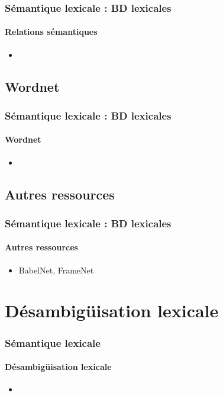 \documentclass[xcolor=table]{beamer}
\begin{document}
\begin{frame}
\frametitle{Sémantique lexicale : BD lexicales}
\framesubtitle{Relations sémantiques}

\begin{itemize}
	\item 
\end{itemize}

\end{frame}

\subsection{Wordnet}

\begin{frame}
\frametitle{Sémantique lexicale : BD lexicales}
\framesubtitle{Wordnet}

\begin{itemize}
	\item 
\end{itemize}

\end{frame}

\subsection{Autres ressources}

\begin{frame}
\frametitle{Sémantique lexicale : BD lexicales}
\framesubtitle{Autres ressources}

\begin{itemize}
	\item BabelNet, FrameNet
\end{itemize}

\end{frame}

\section{Désambigüisation lexicale}

\begin{frame}
\frametitle{Sémantique lexicale}
\framesubtitle{Désambigüisation lexicale}

\begin{itemize}
	\item 	
\end{itemize}

\end{frame}
\end{document}
